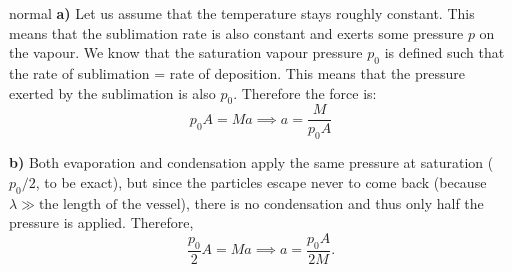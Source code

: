 \begin{solution}{normal} \textbf{a)} Let us assume that the temperature stays roughly constant. This means that the sublimation rate is also constant and exerts some pressure $p$ on the vapour. We know that the saturation vapour pressure $p_0$ is defined such that the rate of sublimation = rate of deposition. This means that the pressure exerted by the sublimation is also $p_0$. Therefore the force is:
$$p_0A=Ma \implies a = \boxed{\frac{M}{p_0 A}}$$
\vspace{3mm}

\noindent \textbf{b)} Both evaporation and condensation apply the same pressure at saturation ($p_0/2$, to be exact), but since the particles escape never to come back (because $\lambda\gg\text{the length of the vessel}$), there is no condensation and thus only half the pressure is applied. Therefore, 
\[\frac{p_0}{2}A = Ma\implies a = \boxed{\frac{p_0 A}{2M}}.\]

\end{solution}